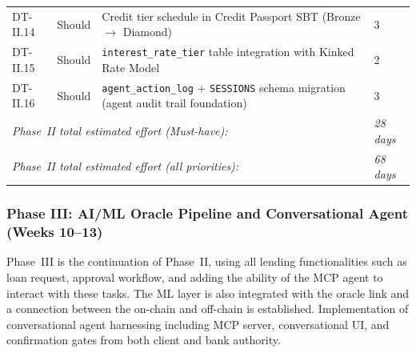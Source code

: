 \documentclass[12pt,a4paper]{report}
\begin{document}
\begin{table}[H]
\begin{tabular}{p{1.8cm}p{1.8cm}p{7.5cm}p{1.5cm}}
DT-II.14 & Should & Credit tier schedule in Credit Passport SBT (Bronze $\to$ Diamond) & 3 \\
DT-II.15 & Should & \texttt{interest\_rate\_tier} table integration with Kinked Rate Model & 2 \\
DT-II.16 & Should & \texttt{agent\_action\_log} + \texttt{SESSIONS} schema migration (agent audit trail foundation) & 3 \\
\multicolumn{3}{l}{\textit{Phase~II total estimated effort (Must-have):}} & \textit{28 days} \\
\multicolumn{3}{l}{\textit{Phase~II total estimated effort (all priorities):}} & \textit{68 days} \\
\bottomrule
\end{tabular}
\end{table}


\subsubsection{Phase III: AI/ML Oracle Pipeline and Conversational Agent (Weeks 10--13)}

Phase~III is the continuation of Phase~II, using all lending functionalities such as loan request, approval workflow, and adding the ability of the MCP agent to interact with these tasks. The ML layer is also integrated with the oracle link and a connection between the on-chain and off-chain is established. Implementation of conversational agent harnessing including MCP server, conversational UI, and confirmation gates from both client and bank authority.
\end{document}
